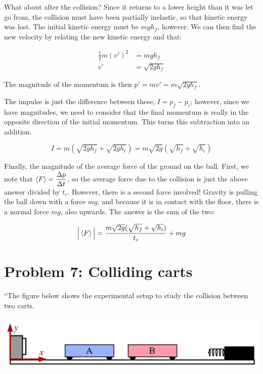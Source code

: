\documentclass[12pt,a4paper]{report}
\begin{document}
What about after the collision? Since it returns to a lower height than it was let go from, the collision must have been partially inelastic, so that kinetic energy was lost. The initial kinetic energy must be $m g h_f$, however. We can then find the new velocity by relating the new kinetic energy and that:

\begin{align}
\frac{1}{2} m (v')^2 &= m g h_f\\
v' &= \sqrt{2 g h_f}
\end{align}

The magnitude of the momentum is then $p' = m v' = m \sqrt{2 g h_f}$.

The impulse is just the difference between these, $I = p_f - p_i$; however, since we have magnitudes, we need to consider that the final momentum is really in the opposite direction of the initial momentum. This turns this subtraction into an addition.

\begin{equation}
I = m(\sqrt{2 g h_f} + \sqrt{2 g h_i}) = m \sqrt{2 g}(\sqrt{h_f} + \sqrt{h_i})
\end{equation}

Finally, the magnitude of the average force of the ground on the ball. First, we note that $\displaystyle \Braket{F} = \frac{\Delta p}{\Delta t}$, so the average force due to the collision is just the above answer divided by $t_c$. However, there is a second force involved! Gravity is pulling the ball down with a force $m g$, and because it is in contact with the floor, there is a normal force $m g$, also upwards. The answer is the sum of the two:

\begin{equation}
\Big|\Braket{F}\Big| = \frac{m \sqrt{2 g}(\sqrt{h_f} + \sqrt{h_i})}{t_c} + m g
\end{equation}

\section{Problem 7: Colliding carts}

``The figure below shows the experimental setup to study the collision between two carts.

\begin{center}
\includegraphics[scale=0.6]{Graphics/h6p7}
\end{center}
\end{document}
